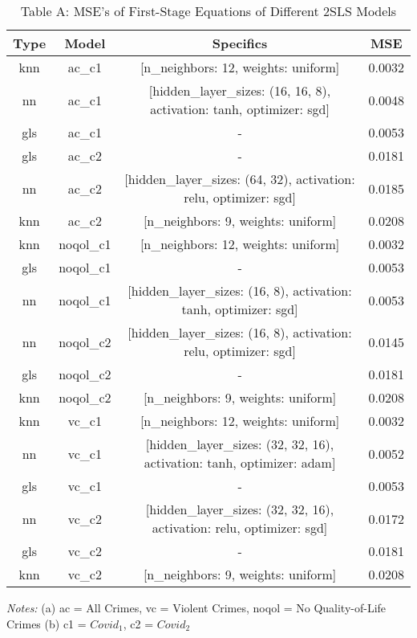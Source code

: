 \begin{table}[htbp]
  \centering
  \caption*{Table A: MSE's of First-Stage Equations of Different 2SLS Models}
  \label{tab:first_stage_mses}
  \begin{tabular}{cccc}
    \toprule
    \textbf{Type} & \textbf{Model} & \textbf{Specifics} & \textbf{MSE} \\
    \midrule
    knn & ac\_c1 & [n\_neighbors: 12, weights: uniform] & 0.0032 \\
    nn & ac\_c1 & [hidden\_layer\_sizes: (16, 16, 8), activation: tanh, optimizer: sgd] & 0.0048 \\
    gls & ac\_c1 & - & 0.0053 \\
    gls & ac\_c2 & - & 0.0181 \\
    nn & ac\_c2 & [hidden\_layer\_sizes: (64, 32), activation: relu, optimizer: sgd] & 0.0185 \\
    knn & ac\_c2 & [n\_neighbors: 9, weights: uniform] & 0.0208 \\
    knn & noqol\_c1 & [n\_neighbors: 12, weights: uniform] & 0.0032 \\
    gls & noqol\_c1 & - & 0.0053 \\
    nn & noqol\_c1 & [hidden\_layer\_sizes: (16, 8), activation: tanh, optimizer: sgd] & 0.0053 \\
    nn & noqol\_c2 & [hidden\_layer\_sizes: (16, 8), activation: relu, optimizer: sgd] & 0.0145 \\
    gls & noqol\_c2 & - & 0.0181 \\
    knn & noqol\_c2 & [n\_neighbors: 9, weights: uniform] & 0.0208 \\
    knn & vc\_c1 & [n\_neighbors: 12, weights: uniform] & 0.0032 \\
    nn & vc\_c1 & [hidden\_layer\_sizes: (32, 32, 16), activation: tanh, optimizer: adam] & 0.0052 \\
    gls & vc\_c1 & - & 0.0053 \\
    nn & vc\_c2 & [hidden\_layer\_sizes: (32, 32, 16), activation: relu, optimizer: sgd] & 0.0172 \\
    gls & vc\_c2 & - & 0.0181 \\
    knn & vc\_c2 & [n\_neighbors: 9, weights: uniform] & 0.0208 \\
    \bottomrule
  \end{tabular}
  \begin{flushleft}
    \textit{Notes:} (a) ac = All Crimes, vc = Violent Crimes, noqol = No Quality-of-Life Crimes
    (b) c1 = $Covid_1$, c2 = $Covid_2$
  \end{flushleft}
\end{table}